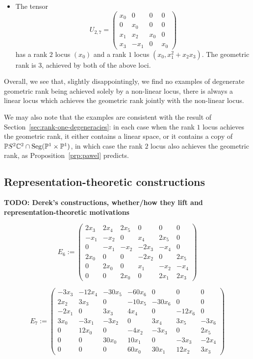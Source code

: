\documentclass[a4paper,10pt]{article}
\def\mtrx#1{\begin{pmatrix}#1\end{pmatrix}}
\DeclareMathOperator{\Seg}{Seg}
\theoremstyle{definition}
\theoremstyle{remark}
\def\TODO#1{{\bfseries\color{red} TODO: #1}}
\begin{document}
\begin{itemize}
    \item The tensor
    \[
        U_{2,7} = \mtrx{
            x_0 & 0 & 0 & 0 \\
            0 & x_0 & 0  & 0 \\
            x_1 & x_2 & x_0 & 0 \\
            x_3 & -x_1 & 0 & x_0
        }
    \]
    has a rank $2$ locus $(x_0)$ and a rank $1$ locus $(x_0, x_1^2+x_2x_3)$. The geometric rank is $3$, achieved by both of the above loci.
\end{itemize}
Overall, we see that, slightly disappointingly, we find no examples of degenerate geometric rank being achieved solely by a non-linear locus, there is always a linear locus which achieves the geometric rank jointly with the non-linear locus.

We may also note that the examples are consistent with the result of Section~\ref{sec:rank-one-degeneracies}: in each case when the rank $1$ locus achieves the geometric rank, it either contains a linear space, or it contains a copy of $\pe S^2\ce^2 \cap \Seg(\pe^1\times\pe^1)$, in which case the rank $2$ locus also achieves the geometric rank, as Proposition~\ref{prp:pawel} predicts.



\subsection{Representation-theoretic constructions}

\TODO{Derek's constructions, whether/how they lift and representation-theoretic motivations}

\[
    E_6 := \mtrx{
        2x_3 & 2x_4 & 2x_5 & 0 & 0 & 0 \\
        -x_1 & -x_2 &    0 & x_4 & 2x_5 & 0 \\
        0 & -x_1 & -x_2 & -2x_3 & -x_4 & 0 \\
        2x_0 & 0 & 0 & -2x_2 & 0 & 2x_5 \\
        0 & 2x_0 & 0 & x_1 & -x_2 & -x_4 \\
        0 & 0 & 2x_0 & 0 & 2x_1 & 2x_3
    }
\]


\[
    E_7 := \mtrx{
        -3x_3 & -12x_4 & -30x_5 & -60x_6 &      0 &      0 &      0 \\
        2x_2 &   3x_3 &      0 & -10x_5 & -30x_6 &      0 &      0 \\
        -2x_1 &      0 &   3x_3 &   4x_4 &      0 & -12x_6 &      0 \\
        3x_0 &  -3x_1 &  -3x_2 &      0 &   3x_4 &   3x_5 &  -3x_6 \\
        0 &  12x_0 &      0 &  -4x_2 &  -3x_3 &      0 &   2x_5 \\
        0 &      0 &  30x_0 &  10x_1 &      0 &  -3x_3 &  -2x_4 \\
        0 &      0 &      0 &  60x_0 &  30x_1 &  12x_2 &   3x_3
    }
\]
\end{document}
